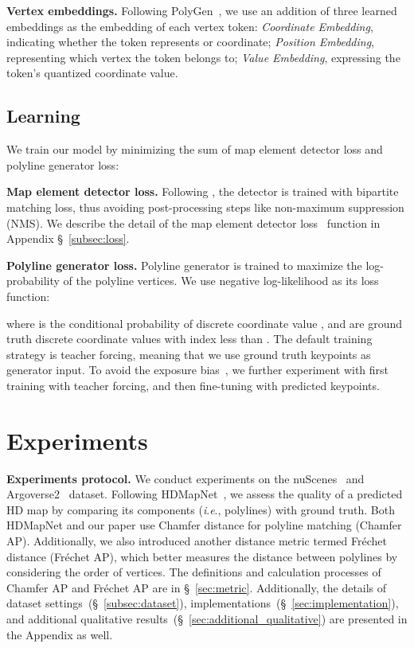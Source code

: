 \documentclass{article}
\newcommand{\ie}{\textit{i}.\textit{e}., }
\theoremstyle{plain}
\theoremstyle{definition}
\theoremstyle{remark}
\begin{document}
\noindent\textbf{Vertex embeddings.} 
Following PolyGen~\citep{nash2020polygen}, we use an addition of three learned embeddings as the embedding of each vertex token: \textit{Coordinate Embedding}, indicating whether the token represents  or  coordinate; \textit{Position Embedding}, representing which vertex the token belongs to; \textit{Value Embedding}, expressing the token's quantized coordinate value. 



\subsection{Learning}
\label{subsec:learning}
We train our model by minimizing the sum of map element detector loss and polyline generator loss:


\noindent\textbf{Map element detector loss.} 
 Following \citep{wang2022detr3d, zhu2020deformable}, the detector is trained with bipartite matching loss, thus avoiding post-processing steps like non-maximum suppression (NMS). We describe the detail of the map element detector loss~ function in Appendix \S~\ref{subsec:loss}.
 
\noindent\textbf{Polyline generator loss.} 
Polyline generator is trained to maximize the log-probability of the polyline vertices. We use negative log-likelihood as its loss function: 

where  is the conditional probability of discrete coordinate value , and  are ground truth discrete coordinate values with index less than .
The default training strategy is teacher forcing, meaning that we use ground truth keypoints as generator input. To avoid the exposure bias~\citep{bengio2015scheduled}, we further experiment with first training with teacher forcing, and then fine-tuning with predicted keypoints. 


\section{Experiments}
\label{sec:experiment}
\noindent\textbf{Experiments protocol.} We conduct experiments on the nuScenes~\citep{caesar2020nuscenes} and Argoverse2~\citep{Argoverse2} dataset. 
Following HDMapNet~\citep{li2021hdmapnet}, we assess the quality of a predicted HD map by comparing its components (\ie polylines) with ground truth.
Both HDMapNet and our paper use Chamfer distance for polyline matching (Chamfer AP). Additionally, we also introduced another distance metric termed Fr\'echet distance (Fr\'echet AP), which better measures the distance between polylines by considering the order of vertices. The definitions and calculation processes of Chamfer AP and Fr\'echet AP are in \S~\ref{sec:metric}.
Additionally, the details of dataset settings~(\S~\ref{subsec:dataset}), implementations~(\S~\ref{sec:implementation}), and additional qualitative results~(\S~\ref{sec:additional_qualitative}) are presented in the Appendix as well. 
\end{document}
